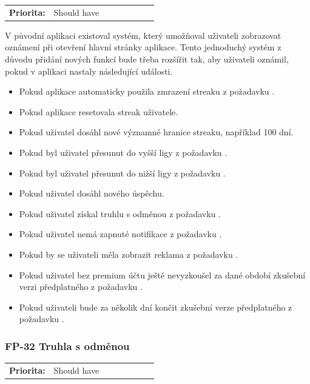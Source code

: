 \begin{tabular}{lp{0.7\linewidth}}
    \textbf{Priorita:} & Should have \\
\end{tabular}

V původní aplikaci existoval systém, který umožňoval uživateli zobrazovat oznámení při otevření hlavní stránky aplikace. Tento jednoduchý systém z důvodu přidání nových funkcí bude třeba rozšířit tak, aby uživateli oznámil, pokud v aplikaci nastaly následující události.

\begin{itemize}
    \item Pokud aplikace automaticky použila zmrazení streaku z požadavku .
    \item Pokud aplikace resetovala streak uživatele.
    \item Pokud uživatel dosáhl nové významné hranice streaku, například 100 dní.
    \item Pokud byl uživatel přesunut do vyšší ligy z požadavku .
    \item Pokud byl uživatel přesunut do nižší ligy z požadavku .
    \item Pokud uživatel dosáhl nového úspěchu.
    \item Pokud uživatel získal truhlu s odměnou z požadavku .
    \item Pokud uživatel nemá zapnuté notifikace z požadavku .
    \item Pokud by se uživateli měla zobrazit reklama z požadavku .
    \item Pokud uživatel bez premium účtu ještě nevyzkoušel za dané období zkušební verzi předplatného z požadavku .
    \item Pokud uživateli bude za několik dní končit zkušební verze předplatného z požadavku .
\end{itemize}

\subsubsection{FP-32 Truhla s odměnou}\label{sec:fp-treasure-chest}

\begin{tabular}{lp{0.7\linewidth}}
    \textbf{Priorita:} & Should have \\
\end{tabular}

